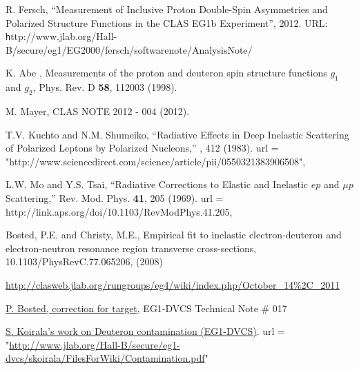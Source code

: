 R. Fersch, ``Measurement of Inclusive Proton Double-Spin Asymmetries and Polarized Structure Functions in the CLAS EG1b Experiment'', 2012. URL: {\texttt http://www.jlab.org/Hall-B/secure/eg1/EG2000/fersch/softwarenote/AnalysisNote/}

 K. Abe \etal, Measurements of the proton and deuteron spin structure functions ${g}_{1}$ and ${g}_{2}$, Phys. Rev. D \textbf{58}, 112003 (1998).     

 M. Mayer, CLAS NOTE 2012 - 004 (2012).  %


 T.V. Kuchto and N.M. Shumeiko,  ``Radiative Effects in Deep Inelastic Scattering of Polarized Leptons by Polarized Nucleons,'' , 412 (1983).       	url = "http://www.sciencedirect.com/science/article/pii/0550321383906508",

 L.W. Mo and Y.S. Tsai, ``Radiative Corrections to Elastic and Inelastic $ep$ and $\mu p$ Scattering,'' Rev. Mod. Phys. \textbf{41}, 205 (1969).        url = {http://link.aps.org/doi/10.1103/RevModPhys.41.205},


        Bosted, P.E. and Christy, M.E., Empirical fit to inelastic electron-deuteron and  electron-neutron resonance region transverse cross-sections,
        10.1103/PhysRevC.77.065206, (2008)



 \href{http://clasweb.jlab.org/rungroups/eg4/wiki/index.php/October\_14\%2C\_2011\#Target\_Composition}{http://clasweb.jlab.org/rungroups/eg4/wiki/index.php/October\_14\%2C\_2011}

 \href{http://wwwold.jlab.org/Hall-B/secure/eg1-dvcs/technotes/hind/hind.pdf}{P. Bosted,  correction for  target}, EG1-DVCS Technical Note \# 017

 \href{http://wwwold.jlab.org/Hall-B/secure/eg1-dvcs/skoirala/ND3Contam/WideContamDist.gif}{S. Koirala's work on Deuteron contamination (EG1-DVCS)}.  	url = "\url{http://www.jlab.org/Hall-B/secure/eg1-dvcs/skoirala/FilesForWiki/Contamination.pdf}"





